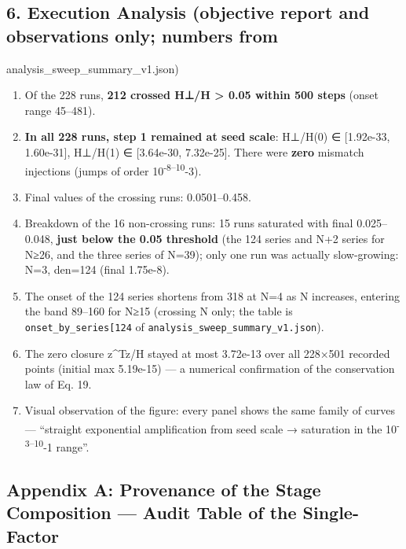\documentclass[
  a4paper,
]{ltjsarticle}
\providecommand{\tightlist}{%
  \setlength{\itemsep}{0pt}\setlength{\parskip}{0pt}}
\begin{document}
\subsection{6. Execution Analysis (objective report and observations
only; numbers
from}\label{execution-analysis-objective-report-and-observations-only-numbers-from}

analysis\_sweep\_summary\_v1.json)

\begin{enumerate}
\def\labelenumi{\arabic{enumi}.}
\tightlist
\item
  Of the 228 runs, \textbf{212 crossed H⊥/H \textgreater{} 0.05 within
  500 steps} (onset range 45--481).
\item
  \textbf{In all 228 runs, step 1 remained at seed scale}: H⊥/H(0) ∈
  {[}1.92e-33, 1.60e-31{]}, H⊥/H(1) ∈ {[}3.64e-30, 7.32e-25{]}. There
  were \textbf{zero} mismatch injections (jumps of order
  10\textsuperscript{-8--10}-3).
\item
  Final values of the crossing runs: 0.0501--0.458.
\item
  Breakdown of the 16 non-crossing runs: 15 runs saturated with final
  0.025--0.048, \textbf{just below the 0.05 threshold} (the 124 series
  and N+2 series for N≥26, and the three series of N=39); only one run
  was actually slow-growing: N=3, den=124 (final 1.75e-8).
\item
  The onset of the 124 series shortens from 318 at N=4 as N increases,
  entering the band 89--160 for N≥15 (crossing N only; the table is
  \texttt{onset\_by\_series{[}\textquotesingle{}124\textquotesingle{}{]}}
  of \texttt{analysis\_sweep\_summary\_v1.json}).
\item
  The zero closure \textbar z\^{}Tz\textbar/H stayed at most 3.72e-13
  over all 228×501 recorded points (initial max 5.19e-15) --- a
  numerical confirmation of the conservation law of Eq. 19.
\item
  Visual observation of the figure: every panel shows the same family of
  curves --- ``straight exponential amplification from seed scale →
  saturation in the 10\textsuperscript{-3--10}-1 range''.
\end{enumerate}

\subsection{Appendix A: Provenance of the Stage Composition --- Audit
Table of the
Single-Factor}\label{appendix-a-provenance-of-the-stage-composition-audit-table-of-the-single-factor}
\end{document}
